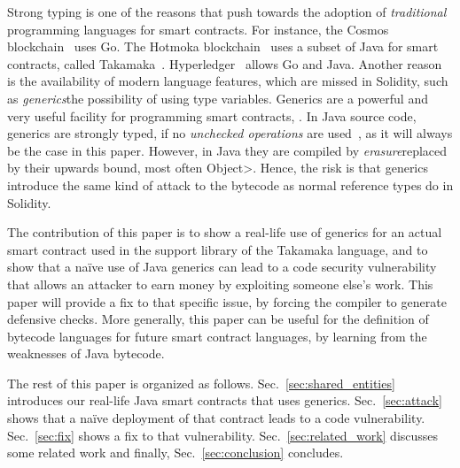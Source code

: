Strong typing is one of the reasons that push towards the adoption
of \emph{traditional} programming languages for smart contracts. For instance,
the Cosmos blockchain~\cite{cosmos} uses Go. The
Hotmoka blockchain~\cite{hotmoka} uses a subset of Java
for smart contracts, called Takamaka~\cite{Spoto19,Spoto20}.
Hyperledger~\cite{hyperldeger} allows Go and Java.
Another reason is the availability of modern
language features, which are missed in Solidity,
such as \emph{generics}\ie the possibility of using
type variables. Generics are a powerful and very useful facility for programming
smart contracts, . In Java source code, generics are strongly typed, if no \emph{unchecked operations}
are used~\cite{NaftalinW06}, as it will always be the case in this paper.
However,  in Java they are compiled by \emph{erasure}\ie replaced
by their upwards bound, most often \<Object>. Hence, the risk
is that generics introduce the same kind of attack to the bytecode
as normal reference types do in Solidity.

The contribution of this paper is to show a real-life
use of generics for an actual smart contract used in the support
library of the Takamaka language, and to show that a na\"{i}ve use
of Java generics can lead to a code security vulnerability that
allows an attacker to earn money by exploiting someone else's work.
This paper will provide a fix to that specific issue,
by forcing the compiler to generate defensive checks.
More generally, this paper can be useful for the definition of
bytecode languages for future smart contract languages, by
learning from the weaknesses of Java bytecode.

The rest of this paper is organized as follows.
Sec.~\ref{sec:shared_entities} introduces our real-life Java smart
contracts that uses generics. Sec.~\ref{sec:attack} shows that a na\"{i}ve
deployment of that contract leads to a code vulnerability.
Sec.~\ref{sec:fix} shows a fix to that vulnerability.
Sec.~\ref{sec:related_work} discusses some related work and finally,
Sec.~\ref{sec:conclusion} concludes.

